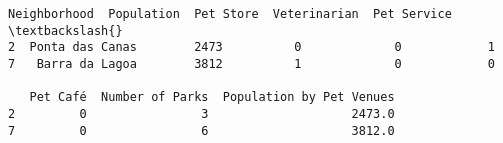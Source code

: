 \documentclass[11pt]{article}
\makeatletter
\newcommand{\boxspacing}{\kern\kvtcb@left@rule\kern\kvtcb@boxsep}
\newcommand{\prompt}[4]{
        \ttfamily\llap{{\color{#2}[#3]:\hspace{3pt}#4}}\vspace{-\baselineskip}
    }
\makeatother
\begin{document}
            \begin{tcolorbox}[breakable, size=fbox, boxrule=.5pt, pad at break*=1mm, opacityfill=0]
\prompt{Out}{outcolor}{44}{\boxspacing}
\begin{Verbatim}[commandchars=\\\{\}]
      Neighborhood  Population  Pet Store  Veterinarian  Pet Service  \textbackslash{}
2  Ponta das Canas        2473          0             0            1
7   Barra da Lagoa        3812          1             0            0

   Pet Café  Number of Parks  Population by Pet Venues
2         0                3                    2473.0
7         0                6                    3812.0
\end{Verbatim}
\end{tcolorbox}
        
\end{document}
